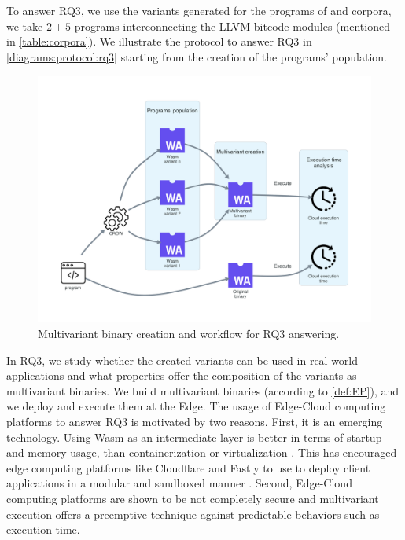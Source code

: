 
\section{\rqthree}
\label{rq3:method}




\newcommand{\mewe}{MEWE\xspace}

To answer RQ3, we use the variants generated for the programs of \corpussodium and \corpusqrcode corpora, we take $2 + 5$ programs interconnecting the LLVM bitcode modules (mentioned in \autoref{table:corpora}). We illustrate the protocol to answer RQ3 in \autoref{diagrams:protocol:rq3} starting from the creation of the programs' population.

\begin{figure}[h]
    \centering
    \includegraphics[width=0.8\linewidth]{diagrams/Rq3.pdf}
    \caption{Multivariant binary creation and workflow for RQ3 answering.}
    \label{diagrams:protocol:rq3}
\end{figure}

In RQ3, we study whether the created variants can be used in real-world applications and what properties offer the composition of the variants as multivariant binaries. We build multivariant binaries (according to \autoref{def:EP}), and we deploy and execute them at the Edge. 
The usage of Edge-Cloud computing platforms to answer RQ3 is motivated by two reasons. First, it is an emerging technology. 
Using Wasm as an intermediate layer is better in terms of startup and memory usage, than containerization or virtualization \cite{pMendkiServerless, 1244493Jacobsson}. 
This has encouraged edge computing platforms like Cloudflare and Fastly to use \wasm to deploy client applications in a modular and sandboxed manner  \cite{CloudflareWasm, FastlyWasm}.
Second, Edge-Cloud computing platforms are shown to be not completely secure \cite{Narayan2021Swivel} and multivariant execution offers a preemptive technique against predictable behaviors such as execution time.




